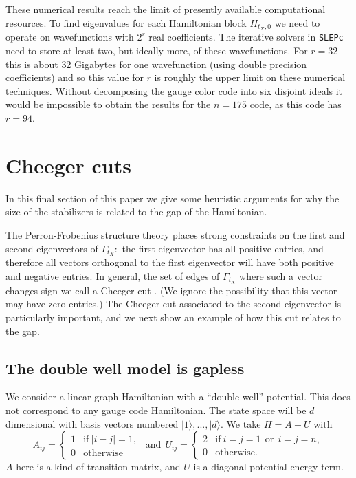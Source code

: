 \documentclass[a4paper,onecolumn,11pt,unpublished]{quantumarticle}
\def\Ham{H}
\newcommand{\ket}[1]{|{#1}\rangle}
\begin{document}
These numerical results reach the limit of presently available 
computational resources.
To find eigenvalues for each Hamiltonian block $H_{t_X,0}$
we need to operate on wavefunctions with $2^r$ real coefficients.
The iterative solvers in {\tt SLEPc} need to store at least two,
but ideally more, of these wavefunctions.
For $r=32$ this is about 32 Gigabytes for one wavefunction (using double
precision coefficients) and so this value for $r$ is roughly the
upper limit on these numerical techniques.
Without decomposing the gauge color code into six disjoint ideals
it would be impossible to obtain the results for the $n=175$ code,
as this code has $r=94$.


\section{Cheeger cuts}\label{Sec7}

In this final section of this paper 
we give some heuristic
arguments for why the size of the stabilizers is
related to the gap of the Hamiltonian. 

The Perron-Frobenius structure theory places
strong constraints on the first and second
eigenvectors of $\Gamma_{t_X}:$
the first eigenvector has all positive entries,
and therefore all vectors orthogonal to the first
eigenvector will have both positive and negative entries.
In general, the set of edges of $\Gamma_{t_X}$ where
such a vector changes sign we call a Cheeger cut 
\cite{Cheeger1970,Chung1997}.
(We ignore the possibility that this vector
may have zero entries.)
The Cheeger cut associated to the second eigenvector
is particularly important, and we next show an
example of how this cut relates to the gap.

\subsection{The double well model is gapless}\label{Sec71}

We consider a linear graph Hamiltonian
with a ``double-well'' potential.
This does not correspond to any gauge code Hamiltonian.
The state space will be $d$ dimensional with
basis vectors numbered $\ket{1},...,\ket{d}.$
We take
$ \Ham = A + U $
with
$$
A_{ij} = \left\{ \begin{array}{ll}
     1 &\mbox{if}\  |i-j|=1,  \\
     0 &\mbox{otherwise}\end{array}\right.
\ \ \mbox{and}\ \ 
U_{ij} =  \left\{ \begin{array}{ll}
     2 &\mbox{if}\  i=j=1 \ \ \mbox{or}\ \  i=j=n, \\
     0 &\mbox{otherwise.}\end{array}\right.
$$
$A$ here is a kind of transition matrix,
and $U$ is a diagonal potential energy term.
\end{document}
